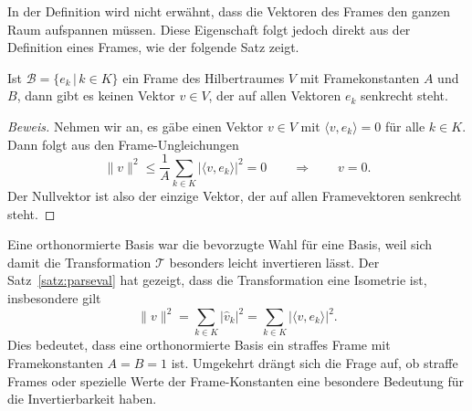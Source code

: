 In der Definition wird nicht erwähnt, dass die Vektoren des Frames den
ganzen Raum aufspannen müssen.
Diese Eigenschaft folgt jedoch direkt aus der Definition eines Frames,
wie der folgende Satz zeigt.

\begin{satz}
\label{geometrie:frame:erzeugt}
Ist $\mathcal{B}=\{ e_k\,|\, k\in K\}$ ein Frame des Hilbertraumes $V$
mit Framekonstanten $A$ und $B$, dann gibt es keinen Vektor $v\in V$,
der auf allen Vektoren $e_k$ senkrecht steht.
\end{satz}

\begin{proof}[Beweis]
Nehmen wir an, es gäbe einen Vektor $v\in V$ mit $\langle v,e_k\rangle=0$
für alle $k\in K$.
Dann folgt aus den Frame-Ungleichungen
\[
\| v \|^2 \le \frac1{A} \sum_{k\in K} |\langle v,e_k\rangle|^2 = 0
\qquad\Rightarrow\qquad
v=0.
\]
Der Nullvektor ist also der einzige Vektor, der auf allen Framevektoren
senkrecht steht.
\end{proof}

Eine orthonormierte Basis war die bevorzugte Wahl für eine Basis, weil
sich damit die Transformation $\mathcal{T}$ besonders leicht invertieren
lässt.
Der Satz~\ref{satz:parseval} hat gezeigt, dass die Transformation %
eine Isometrie ist, insbesondere gilt
\[
\|v\|^2
=
\sum_{k\in K} |\hat{v}_k|^2
=
\sum_{k\in K} |\langle v,e_k\rangle|^2.
\]
Dies bedeutet, dass eine orthonormierte Basis ein straffes Frame mit
Framekonstanten $A=B=1$ ist.
Umgekehrt drängt sich die Frage auf, ob straffe Frames oder spezielle
Werte der Frame-Konstanten eine besondere Bedeutung für die Invertierbarkeit
haben.

